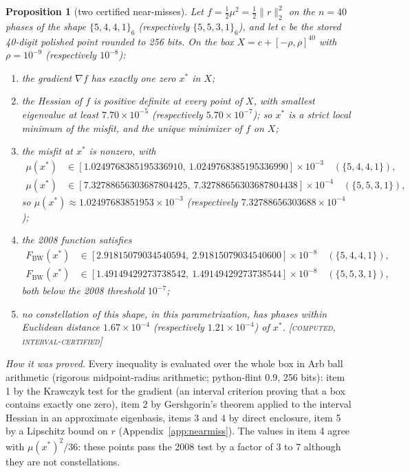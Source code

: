 \documentclass[11pt]{article}
\newcommand{\norm}[1]{\lVert #1\rVert}
\newcommand{\st}[1]{\textsc{[#1]}}
\newcommand{\stcert}{\st{computed, interval-certified}}
\newtheorem{proposition}[theorem]{Proposition}
\theoremstyle{definition}
\theoremstyle{remark}
\begin{document}
\begin{proposition}[two certified near-misses]\label{prop:nearmiss}
Let $f=\frac12\mu^2=\frac12\norm{r}_2^2$ on the $n=40$ phases of the shape $\{5,4,4,1\}_6$ (respectively
$\{5,5,3,1\}_6$), and let $c$ be the stored 40-digit polished point rounded to 256 bits. On the box
$X=c+[-\rho,\rho]^{40}$ with $\rho=10^{-9}$ (respectively $10^{-8}$):
\begin{enumerate}
\item the gradient $\nabla f$ has exactly one zero $x^\ast$ in $X$;
\item the Hessian of $f$ is positive definite at every point of $X$, with smallest eigenvalue at least $7.70\times10^{-5}$
(respectively $5.70\times10^{-7}$); so $x^\ast$ is a strict local minimum of the misfit, and the unique minimizer of $f$ on $X$;
\item the misfit at $x^\ast$ is nonzero, with
\begin{align*}
\mu(x^\ast)&\in[1.0249768385195336910,\ 1.0249768385195336990]\times10^{-3}\quad(\{5,4,4,1\}),\\
\mu(x^\ast)&\in[7.32788656303687804425,\ 7.32788656303687804438]\times10^{-4}\quad(\{5,5,3,1\}),
\end{align*}
so $\mu(x^\ast)\approx1.02497683851953\times10^{-3}$ (respectively $7.32788656303688\times10^{-4}$);
\item the 2008 function satisfies
\begin{align*}
F_{\mathrm{BW}}(x^\ast)&\in[2.91815079034540594,\ 2.91815079034540600]\times10^{-8}\quad(\{5,4,4,1\}),\\
F_{\mathrm{BW}}(x^\ast)&\in[1.49149429273738542,\ 1.49149429273738544]\times10^{-8}\quad(\{5,5,3,1\}),
\end{align*}
both below the 2008 threshold $10^{-7}$;
\item no constellation of this shape, in this parametrization, has phases within Euclidean distance $1.67\times10^{-4}$
(respectively $1.21\times10^{-4}$) of $x^\ast$. \stcert
\end{enumerate}
\end{proposition}

\noindent\emph{How it was proved.} Every inequality is evaluated over the whole box in Arb ball arithmetic (rigorous
midpoint-radius arithmetic; python-flint 0.9, 256 bits): item 1 by the Krawczyk test for the gradient (an interval criterion
proving that a box contains exactly one zero), item 2 by Gershgorin's theorem applied to the interval Hessian in an
approximate eigenbasis, items 3 and 4 by direct enclosure, item 5 by a Lipschitz bound on $r$ (Appendix~\ref{app:nearmiss}).
The values in item 4 agree with $\mu(x^\ast)^2/36$: these points pass the 2008 test by a factor of 3 to 7 although they are
not constellations.
\end{document}
